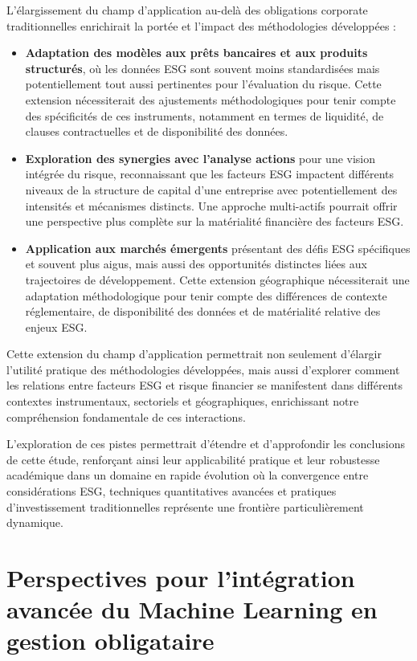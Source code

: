 L'élargissement du champ d'application au-delà des obligations corporate traditionnelles enrichirait la portée et l'impact des méthodologies développées :
\begin{itemize}
    \item \textbf{Adaptation des modèles aux prêts bancaires et aux produits structurés}, où les données ESG sont souvent moins standardisées mais potentiellement tout aussi pertinentes pour l'évaluation du risque. Cette extension nécessiterait des ajustements méthodologiques pour tenir compte des spécificités de ces instruments, notamment en termes de liquidité, de clauses contractuelles et de disponibilité des données.
    
    \item \textbf{Exploration des synergies avec l'analyse actions} pour une vision intégrée du risque, reconnaissant que les facteurs ESG impactent différents niveaux de la structure de capital d'une entreprise avec potentiellement des intensités et mécanismes distincts. Une approche multi-actifs pourrait offrir une perspective plus complète sur la matérialité financière des facteurs ESG.
    
    \item \textbf{Application aux marchés émergents} présentant des défis ESG spécifiques et souvent plus aigus, mais aussi des opportunités distinctes liées aux trajectoires de développement. Cette extension géographique nécessiterait une adaptation méthodologique pour tenir compte des différences de contexte réglementaire, de disponibilité des données et de matérialité relative des enjeux ESG.
\end{itemize}

Cette extension du champ d'application permettrait non seulement d'élargir l'utilité pratique des méthodologies développées, mais aussi d'explorer comment les relations entre facteurs ESG et risque financier se manifestent dans différents contextes instrumentaux, sectoriels et géographiques, enrichissant notre compréhension fondamentale de ces interactions.

L'exploration de ces pistes permettrait d'étendre et d'approfondir les conclusions de cette étude, renforçant ainsi leur applicabilité pratique et leur robustesse académique dans un domaine en rapide évolution où la convergence entre considérations ESG, techniques quantitatives avancées et pratiques d'investissement traditionnelles représente une frontière particulièrement dynamique.

\section*{Perspectives pour l'intégration avancée du Machine Learning en gestion obligataire}

